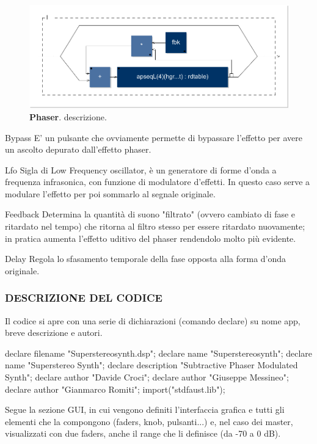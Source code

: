 \documentclass[
	a4paper,
	twocolumn
	]{article}
\begin{document}
\begin{figure}[b]%
\begin{center}
\includegraphics[width=.47\textwidth]{img/phaser.pdf}
\caption{\textbf{Phaser}. descrizione.}
\label{phas}
\end{center}
\end{figure}

Bypass
E' un pulsante che ovviamente permette di bypassare l'effetto per avere un
ascolto depurato dall'effetto phaser.

Lfo
Sigla di Low Frequency oscillator, è un generatore di forme d'onda a frequenza
infrasonica, con funzione di modulatore d'effetti. In questo caso serve a
modulare l'effetto per poi sommarlo al segnale originale.

Feedback
Determina la quantità di suono "filtrato" (ovvero cambiato di fase e
ritardato nel tempo) che ritorna al filtro stesso per essere ritardato
nuovamente; in pratica aumenta l'effetto uditivo del phaser rendendolo
molto più evidente.

Delay
Regola lo sfasamento temporale della fase opposta alla forma d'onda originale.




\subsubsection*{DESCRIZIONE DEL CODICE}

Il codice si apre con una serie di dichiarazioni (comando declare) su nome app,
breve descrizione e autori.

declare filename "Superstereosynth.dsp"; declare name "Superstereosynth";
declare name "Superstereo Synth";
declare description "Subtractive Phaser Modulated Synth";
declare author "Davide Croci";
declare author "Giuseppe Messineo";
declare author "Gianmarco Romiti";
import("stdfaust.lib");

Segue la sezione GUI, in cui vengono definiti l'interfaccia grafica e tutti gli
elementi che la compongono (faders, knob, pulsanti...) e, nel caso dei master,
visualizzati con due faders, anche il range che li definisce (da -70 a 0 dB).
\end{document}
